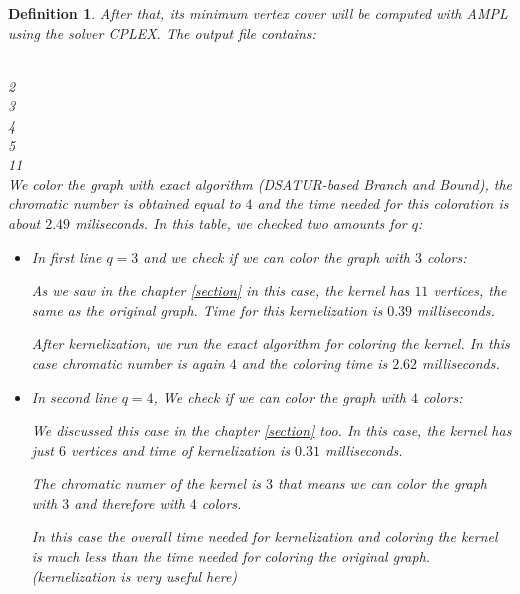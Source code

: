 \documentclass[12pt]{article}
\theoremstyle{slplain}
\newtheorem{defi}{Definition}
\begin{document}
\begin{defi}
After that, its minimum vertex cover will be computed with AMPL using the solver CPLEX. The output file contains:

 \\
2 \\
3 \\
4 \\
5 \\
11 \\


We color the graph with exact algorithm (DSATUR-based Branch and Bound), the chromatic number is obtained equal to $4$ and the time needed for this coloration is about $2.49$ miliseconds.  In this table, we checked two amounts for $q$: 

\begin{itemize}
\item In first line $q = 3$ and we check if we can color the graph with $3$ colors:

As we saw in the chapter \ref{section} in this case, the kernel has $11$ vertices, the same as the original graph. Time for this kernelization is $0.39$ milliseconds. 

After kernelization, we run the exact algorithm for coloring the kernel. In this case chromatic number is again $4$ and the coloring time is $2.62$ milliseconds. 

\item In second line $q = 4$, We check if we can color the graph with $4$ colors:

We discussed this case in the chapter \ref{section} too. In this case, the kernel has just $6$ vertices and time of kernelization is $0.31$ milliseconds.

The chromatic numer of the kernel is $3$ that means we can color the graph with $3$ and therefore with $4$ colors. 

In this case the overall time needed for kernelization and coloring the kernel is much less than the time needed for coloring the original graph. (kernelization is very useful here)
\end{itemize}


\end{defi}
\end{document}
